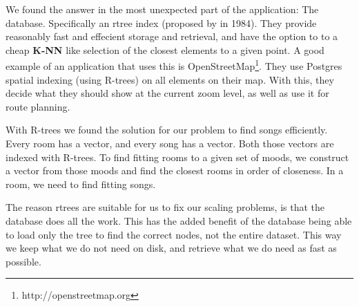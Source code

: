 We found the answer in the most unexpected part of the application: The database.
Specifically an \gls{rtree} index (proposed by \citeauthor{Guttman84r-trees:a} in 1984). 
They provide reasonably fast and effecient storage and retrieval, and have the option to to a cheap \textbf{K-NN} like selection of the closest elements to a given point.
A good example of an application that uses this is OpenStreetMap\footnote{http://openstreetmap.org}.
They use Postgres spatial indexing (using R-trees) on all elements on their map.
With this, they decide what they should show at the current zoom level, as well as use it for route planning.

With R-trees we found the solution for our problem to find songs efficiently.
Every room has a vector, and every song has a vector.
Both those vectors are indexed with R-trees.
To find fitting rooms to a given set of moods, we construct a vector from those moods and find the closest rooms in order of closeness.
In a room, we need to find fitting songs.

The reason \glspl{rtree} are suitable for us to fix our scaling problems, is that the database does all the work.
This has the added benefit of the database being able to load only the tree to find the correct nodes, not the entire dataset.
This way we keep what we do not need on disk, and retrieve what we do need as fast as possible.

